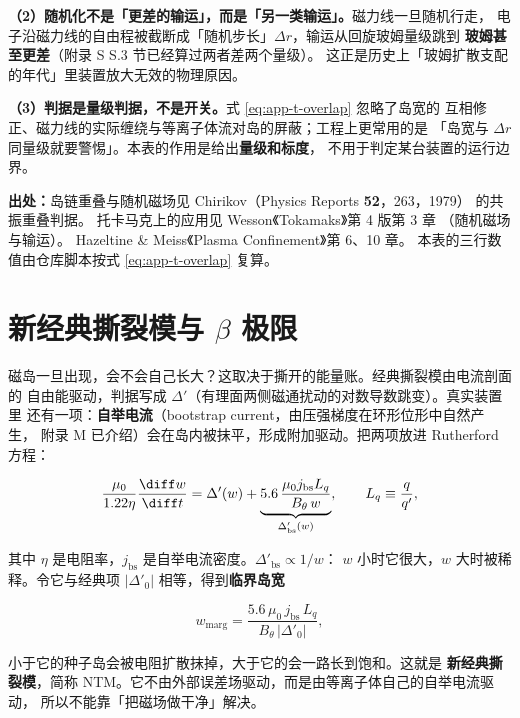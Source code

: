 \textbf{（2）随机化不是「更差的输运」，而是「另一类输运」。}磁力线一旦随机行走，
电子沿磁力线的自由程被截断成「随机步长」$\Delta r$，输运从回旋玻姆量级跳到
\textbf{玻姆甚至更差}（附录 S S.3 节已经算过两者差两个量级）。
这正是历史上「玻姆扩散支配的年代」里装置放大无效的物理原因。

\textbf{（3）判据是量级判据，不是开关。}式 \eqref{eq:app-t-overlap} 忽略了岛宽的
互相修正、磁力线的实际缠绕与等离子体流对岛的屏蔽；工程上更常用的是
「岛宽与 $\Delta r$ 同量级就要警惕」。本表的作用是给出\textbf{量级和标度}，
不用于判定某台装置的运行边界。

{\footnotesize
\textbf{出处：}岛链重叠与随机磁场见 Chirikov（Physics Reports \textbf{52}，263，1979）
的共振重叠判据。
托卡马克上的应用见 Wesson《Tokamaks》第 4 版第 3 章
（随机磁场与输运）。
Hazeltine \& Meiss《Plasma Confinement》第 6、10 章。
本表的三行数值由仓库脚本按式 \eqref{eq:app-t-overlap} 复算。
}

\section{新经典撕裂模与 \texorpdfstring{$\beta$}{β} 极限}
\label{sec:app-t-ntm}

磁岛一旦出现，会不会自己长大？这取决于撕开的能量账。经典撕裂模由电流剖面的
自由能驱动，判据写成 $\Delta'$（有理面两侧磁通扰动的对数导数跳变）。真实装置里
还有一项：\textbf{自举电流}（bootstrap current，由压强梯度在环形位形中自然产生，
附录 M 已介绍）会在岛内被抹平，形成附加驱动。把两项放进 Rutherford 方程：

\begin{equation}
\frac{\mu_0}{1.22\eta}\frac{\diff w}{\diff t}
=\Delta'(w)+\underbrace{5.6\,\frac{\mu_0 j_{\mathrm{bs}}L_q}{B_\theta\,w}}_{\Delta'_{\mathrm{bs}}(w)} ,
\qquad
L_q\equiv\frac{q}{q'},
\label{eq:app-t-rutherford}
\end{equation}

其中 $\eta$ 是电阻率，$j_{\mathrm{bs}}$ 是自举电流密度。$\Delta'_{\mathrm{bs}}\propto1/w$：
$w$ 小时它很大，$w$ 大时被稀释。令它与经典项 $|\Delta'_0|$ 相等，得到\textbf{临界岛宽}

\begin{equation}
w_{\mathrm{marg}}=\frac{5.6\,\mu_0\,j_{\mathrm{bs}}\,L_q}{B_\theta\,|\Delta'_0|},
\label{eq:app-t-wmarg}
\end{equation}

小于它的种子岛会被电阻扩散抹掉，大于它的会一路长到饱和。这就是
\textbf{新经典撕裂模}，简称 NTM。它不由外部误差场驱动，而是由等离子体自己的自举电流驱动，
所以不能靠「把磁场做干净」解决。


